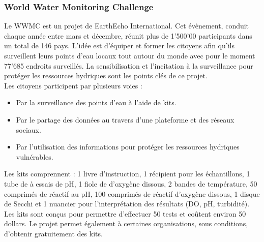 \documentclass[10pt, article]{llncs}
\begin{document}
		\subsubsection{World Water Monitoring Challenge}
			Le WWMC est un projet de EarthEcho International. Cet évènement, conduit chaque année entre mars et décembre, réunit plus de 1'500'00 participants dans un total de 146 pays. L'idée est d'équiper et former les citoyens afin qu'ils surveillent leurs points d'eau locaux tout autour du monde avec pour le moment 77'685 endroits surveillés. La sensibilisation et l'incitation à la surveillance pour protéger les ressources hydriques sont les points clés de ce projet. \\
			Les citoyens participent par plusieurs voies :
			\begin{itemize}
				\item Par la surveillance des points d'eau à l'aide de kits.
				\item Par le partage des données au travers d'une plateforme et des réseaux sociaux.
				\item Par l'utilisation des informations pour protéger les ressources hydriques vulnérables. 
			\end{itemize}
			Les kits comprennent : 1 livre d'instruction, 1 récipient pour les échantillons, 1 tube de à essais de pH, 1 fiole de d'oxygène dissous, 2 bandes de température, 50 comprimés de réactif au pH, 100 comprimés de réactif d'oxygène dissous, 1 disque de Secchi et 1 nuancier pour l'interprétation des résultats (DO, pH, turbidité). Les kits sont conçus pour permettre d'effectuer 50 tests et coûtent environ 50 dollars. Le projet permet également à certaines organisations, sous conditions, d'obtenir gratuitement des kits.
		
\end{document}
